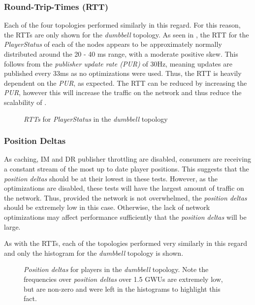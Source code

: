 \subsubsection*{Round-Trip-Times (RTT)}
Each of the four topologies performed similarly in this regard. For this reason, the RTTs are only shown for the \textit{dumbbell} topology. As seen in , the RTT for the \textit{PlayerStatus} of each of the nodes appears to be approximately normally distributed around the 20 - 40 ms range, with a moderate positive skew. This follows from the \textit{publisher update rate (PUR)} of 30Hz, meaning updates are published every 33ms as no optimizations were used. Thus, the RTT is heavily dependent on the \textit{PUR}, as expected. The RTT can be reduced by increasing the \textit{PUR}, however this will increase the traffic on the network and thus reduce the scalability of \game{}.  

\begin{figure}[H]
    \centering
    \caption{\textit{RTTs} for \textit{PlayerStatus} in the \textit{dumbbell} topology}
    \label{fig:eval:basic:rtt}
\end{figure}


\subsubsection*{Position Deltas}
As caching, IM and DR publisher throttling are disabled, consumers are receiving a constant stream of the most up to date player positions. This suggests that the \textit{position deltas} should be at their lowest in these tests. However, as the optimizations are disabled, these tests will have the largest amount of traffic on the network. Thus, provided the network is not overwhelmed, the \textit{position deltas} should be extremely low in this case. Otherwise, the lack of network optimizations may affect performance sufficiently that the \textit{position deltas} will be large. 

As with the RTTs, each of the topologies performed very similarly in this regard and only the histogram for the \textit{dumbbell} topology is shown.

\begin{figure}[H]
    \centering
    \caption{\textit{Position deltas} for players in the \textit{dumbbell} topology. Note the frequencies over \textit{position deltas} over 1.5 GWUs are extremely low, but are non-zero and were left in the histograms to highlight this fact.}
    \label{fig:eval:basic:pos-deltas}
\end{figure}

